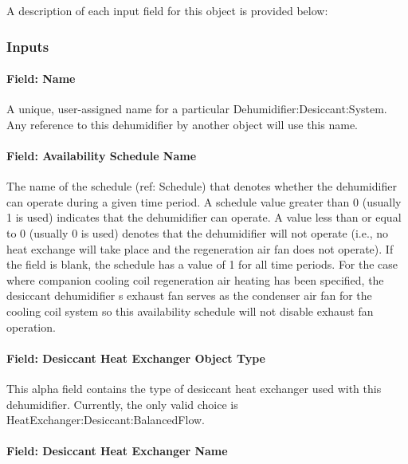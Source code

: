 A description of each input field for this object is provided below:

\subsubsection{Inputs}\label{inputs-1-010}

\paragraph{Field: Name}\label{field-name-1-009}

A unique, user-assigned name for a particular Dehumidifier:Desiccant:System. Any reference to this dehumidifier by another object will use this name.

\paragraph{Field: Availability Schedule Name}\label{field-availability-schedule-name-1-002}

The name of the schedule (ref: Schedule) that denotes whether the dehumidifier can operate during a given time period. A schedule value greater than 0 (usually 1 is used) indicates that the dehumidifier can operate. A value less than or equal to 0 (usually 0 is used) denotes that the dehumidifier will not operate (i.e., no heat exchange will take place and the regeneration air fan does not operate). If the field is blank, the schedule has a value of 1 for all time periods. For the case where companion cooling coil regeneration air heating has been specified, the desiccant dehumidifier s exhaust fan serves as the condenser air fan for the cooling coil system so this availability schedule will not disable exhaust fan operation.

\paragraph{Field: Desiccant Heat Exchanger Object Type}\label{field-desiccant-heat-exchanger-object-type}

This alpha field contains the type of desiccant heat exchanger used with this dehumidifier. Currently, the only valid choice is HeatExchanger:Desiccant:BalancedFlow.

\paragraph{Field: Desiccant Heat Exchanger Name}\label{field-desiccant-heat-exchanger-name}

